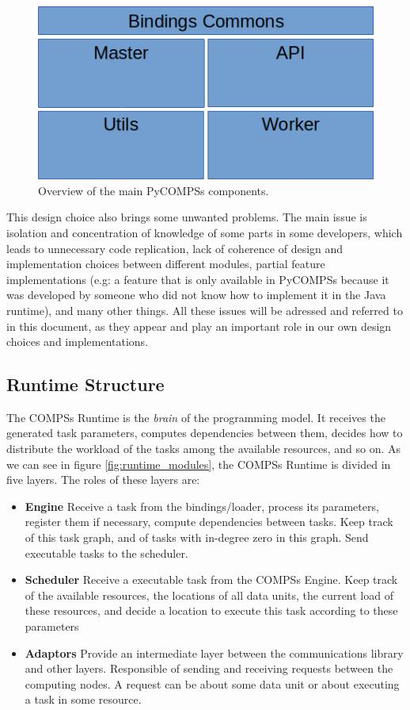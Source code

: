 \begin{figure}
\centering
\includegraphics{figures/pycompss_modules.png}
\caption{Overview of the main PyCOMPSs components.}
\label{fig:pycompss_modules}
\end{figure}

This design choice also brings some unwanted problems. The main issue is isolation and concentration of knowledge of some parts in some developers, which leads to unnecessary code replication, lack of coherence of design and implementation choices between different modules, partial feature implementations (e.g: a feature that is only available in PyCOMPSs because it was developed by someone who did not know how to implement it in the Java runtime), and many other things. All these issues will be adressed and referred to in this document, as they appear and play an important role in our own design choices and implementations.

\subsection{Runtime Structure}
\label{subsec:runtime_structure}

The COMPSs Runtime is the \textit{brain} of the programming model. It receives the generated task parameters, computes dependencies between them, decides how to distribute the workload of the tasks among the available resources, and so on. As we can see in figure \ref{fig:runtime_modules}, the COMPSs Runtime is divided in five layers. The roles of these layers are:

\begin{itemize}
\item \textbf{Engine} Receive a task from the bindings/loader, process its parameters, register them if necessary, compute dependencies between tasks. Keep track of this task graph, and of tasks with in-degree zero in this graph. Send executable tasks to the scheduler.
\item \textbf{Scheduler} Receive a executable task from the COMPSs Engine. Keep track of the available resources, the locations of all data units, the current load of these resources, and decide a location to execute this task according to these parameters
\item \textbf{Adaptors} Provide an intermediate layer between the communications library and other layers. Responsible of sending and receiving requests between the computing nodes. A request can be about some data unit or about executing a task in some resource.
\end{itemize}

